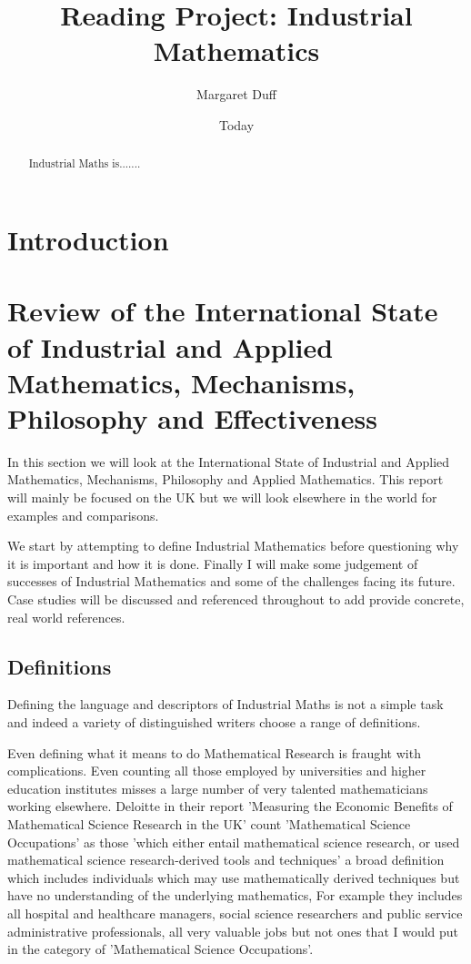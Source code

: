 \documentclass[11pt]{article} %
\begin{document}
	
	\title{Reading Project: Industrial Mathematics }
	\author{Margaret Duff }
	\date{Today}
	\maketitle
	
	\begin{abstract}
		Industrial Maths is.......
	\end{abstract}
	\tableofcontents 
	
	\section{Introduction}
	
	\section{Review of the International State of Industrial and Applied Mathematics, Mechanisms, Philosophy and Effectiveness}
	
	In this section we will look at the International State of Industrial and Applied Mathematics, Mechanisms, Philosophy and Applied Mathematics. This report will mainly be  focused on the UK but we will look elsewhere in the world for examples and comparisons. 
	
	We start by attempting to define Industrial Mathematics before questioning why it is important  and how it is done. Finally I will make some judgement of successes of Industrial Mathematics  and some of the challenges facing its future. Case studies will be discussed and referenced throughout to add provide concrete, real world references. 
	
	\subsection{Definitions} 
	
	Defining the language and descriptors of  Industrial Maths is not a simple task and indeed a variety of distinguished writers choose a range of definitions. 
	
	Even defining what it means to do Mathematical Research is fraught with complications. Even counting all those employed by universities and higher education institutes misses a large number of very talented mathematicians working elsewhere. 	Deloitte in their report 'Measuring the Economic Benefits of Mathematical Science Research in the UK' \cite{deloitteuk} count 'Mathematical Science Occupations' as those 'which either entail mathematical science research, or used mathematical science research-derived tools and techniques' a broad definition which includes individuals which may use mathematically derived techniques but have no understanding of the underlying mathematics, For example they includes all hospital and healthcare managers, social science researchers and public service administrative professionals, all very valuable jobs but not ones that I would put in the category of 'Mathematical Science Occupations'. 
	
\end{document}
